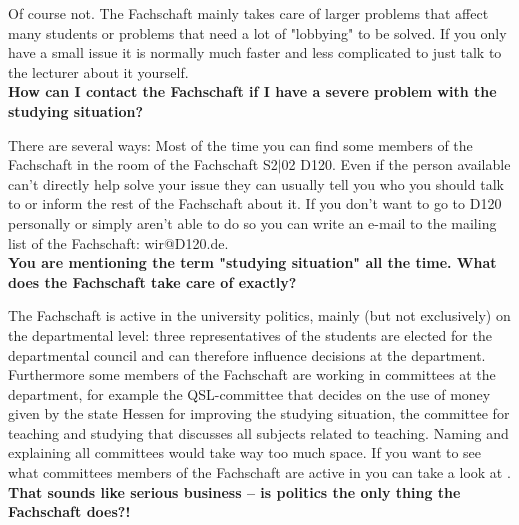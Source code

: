 {    Of course not. The Fachschaft mainly takes care of larger problems that affect many students or problems that need a lot of "lobbying" to be solved. If you only have a small issue it is normally much faster and less complicated to just talk to the lecturer about it yourself.\\

    \textbf{How can I contact the Fachschaft if I have a severe problem with the studying situation?}

    There are several ways: Most of the time you can find some members of the Fachschaft in the room of the Fachschaft S2$|$02 D120. Even if the person available can't directly help solve your issue they can usually tell you who you should talk to or inform the rest of the Fachschaft about it. If you don't want to go to D120 personally or simply aren't able to do so you can write an e-mail to the mailing list of the Fachschaft: wir@D120.de.\\

    \textbf{You are mentioning the term "studying situation" all the time. What does the Fachschaft take care of exactly?}

    The Fachschaft is active in the university politics, mainly (but not exclusively) on the departmental level: three representatives of the students are elected for the departmental council and can therefore influence decisions at the department. Furthermore some members of the Fachschaft are working in committees at the department, for example the QSL-committee that decides on the use of money given by the state Hessen for improving the studying situation, the committee for teaching and studying that discusses all subjects related to teaching. Naming and explaining all committees would take way too much space. If you want to see what committees members of the Fachschaft are active in you can take a look at \footnotemark[1].\\

    \textbf{That sounds like serious business – is politics the only thing the Fachschaft does?!}

}
